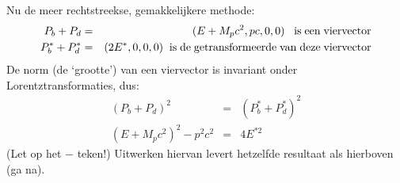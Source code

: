 Nu de meer rechtstreekse, gemakkelijkere methode:
\begin{eqnarray*}
P_{b} + P_{d} & = & (E + M_{p}c^{2}, pc, 0, 0 )  \;\; {\rm \; is \; een \; viervector} \\
P_{b}^{*} + P_{d}^{*} & = & (2E^{*}, 0, 0, 0 )  \;\; {\rm is \; de \; getransformeerde \; van \; deze \; viervector}
\end{eqnarray*}
De norm (de `grootte') van een viervector is invariant onder 
Lorentztransformaties, dus:
\begin{eqnarray*}
(P_{b} + P_{d})^{2} & = & (P_{b}^{*} + P_{d}^{*})^{2} \\
(E + M_{p}c^{2})^{2} - p^{2}c^{2} & = & 4E^{*2}
\end{eqnarray*}
(Let op het $-$ teken!)
Uitwerken hiervan levert hetzelfde resultaat als hierboven (ga na).

